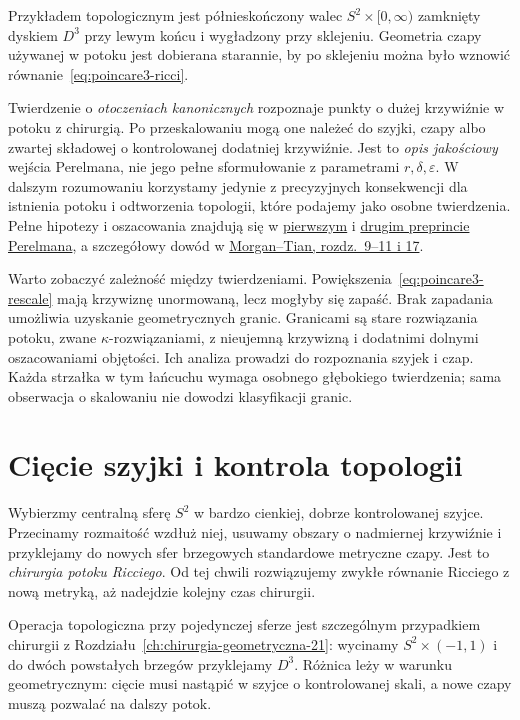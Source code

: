 Przykładem topologicznym jest półnieskończony
walec $S^2\times[0,\infty)$ zamknięty dyskiem
$D^3$ przy lewym końcu i wygładzony przy
sklejeniu. Geometria czapy używanej w potoku
jest dobierana starannie, by po sklejeniu
można było wznowić równanie~\eqref{eq:poincare3-ricci}.

Twierdzenie o \emph{otoczeniach kanonicznych}
rozpoznaje punkty o dużej krzywiźnie w potoku
z chirurgią. Po przeskalowaniu mogą one należeć
do szyjki, czapy albo zwartej składowej
o kontrolowanej dodatniej krzywiźnie.
Jest to \emph{opis jakościowy} wejścia
Perelmana, nie jego pełne sformułowanie
z parametrami $r,\delta,\varepsilon$.
W dalszym rozumowaniu korzystamy jedynie
z precyzyjnych konsekwencji dla istnienia
potoku i odtworzenia topologii, które
podajemy jako osobne twierdzenia.
Pełne hipotezy i oszacowania znajdują się
w \href{https://arxiv.org/pdf/math/0211159}
{pierwszym} i
\href{https://arxiv.org/pdf/math/0303109}
{drugim preprincie Perelmana}, a szczegółowy
dowód w
\href{https://www.claymath.org/library/monographs/cmim03.pdf}
{Morgan--Tian, rozdz.\ 9--11 i 17}.

Warto zobaczyć zależność między twierdzeniami.
Powiększenia~\eqref{eq:poincare3-rescale} mają
krzywiznę unormowaną, lecz mogłyby się zapaść.
Brak zapadania umożliwia uzyskanie geometrycznych
granic. Granicami są stare rozwiązania potoku,
zwane $\kappa$-rozwiązaniami, z nieujemną krzywizną
i dodatnimi dolnymi oszacowaniami objętości.
Ich analiza prowadzi do rozpoznania szyjek i czap.
Każda strzałka w tym łańcuchu wymaga osobnego
głębokiego twierdzenia; sama obserwacja o skalowaniu
nie dowodzi klasyfikacji granic.

\section{Cięcie szyjki i kontrola topologii}
\label{sec:poincare3-chirurgia}

Wybierzmy centralną sferę $S^2$ w bardzo cienkiej,
dobrze kontrolowanej szyjce. Przecinamy
rozmaitość wzdłuż niej, usuwamy obszary
o nadmiernej krzywiźnie i przyklejamy
do nowych sfer brzegowych standardowe
metryczne czapy. Jest to \emph{chirurgia
potoku Ricciego}. Od tej chwili rozwiązujemy
zwykłe równanie Ricciego z nową metryką,
aż nadejdzie kolejny czas chirurgii.

Operacja topologiczna przy pojedynczej sferze
jest szczególnym przypadkiem chirurgii
z Rozdziału~\ref{ch:chirurgia-geometryczna-21}:
wycinamy $S^2\times(-1,1)$ i do dwóch
powstałych brzegów przyklejamy $D^3$.
Różnica leży w warunku geometrycznym:
cięcie musi nastąpić w szyjce o kontrolowanej
skali, a nowe czapy muszą pozwalać na dalszy potok.

